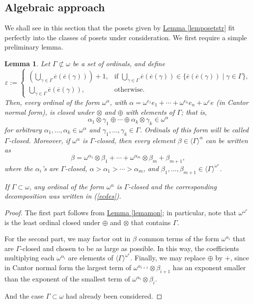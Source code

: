\documentclass[reqno]{amsart}
\newtheorem{lemma}[theorem]{Lemma}
\theoremstyle{definition}
\theoremstyle{definition}
\theoremstyle{plain} %
\begin{document}
\subsection{Algebraic approach} We shall see in this section that the posets given by \hyperref[lemposetstr]{Lemma \ref{lemposetstr}} fit perfectly into the classes of posets under consideration. We first require a simple preliminary lemma.
\begin{lemma}
    Let $\Gamma\not\subset\omega$ be a set of ordinals, and define\[\varepsilon :=\begin{cases}\left(\bigcup_{\gamma\in\Gamma}\overline{e}(\overline{e}(\gamma))\right) + 1, & \text{if } \bigcup_{\gamma\in\Gamma}\overline{e}(\overline{e}(\gamma)) \in \{\overline{e}(\overline{e}(\gamma)) \mid \gamma \in \Gamma\}, \\\bigcup_{\gamma\in\Gamma}\overline{e}(\overline{e}(\gamma)), & \text{otherwise}.\end{cases}\] Then, every ordinal of the form \(\omega^{\alpha}\), with $\alpha=\omega^{\epsilon_1} e_1 + \cdots + \omega^{\epsilon_n} e_n + \omega^{\varepsilon} e$ (in Cantor normal form), is closed under $\otimes$ and $\oplus$ with elements of $\Gamma$; that is,\[\alpha_1 \otimes \gamma_1 \oplus \cdots \oplus \alpha_k \otimes \gamma_k \in \omega^\alpha\]for arbitrary $\alpha_1, \dots, \alpha_k \in \omega^\alpha$ and $\gamma_1, \dots, \gamma_k \in \Gamma$. Ordinals of this form will be called \emph{$\Gamma$-closed}. Moreover, if $\omega^\alpha$ is $\Gamma$-closed, then every element $\beta\in\langle \Gamma \rangle^\alpha$ can be written as \[ \beta = \omega^{\alpha_1} \otimes \beta_1 + \cdots + \omega^{\alpha_m} \otimes \beta_m + \beta_{m+1}, \] where the $\alpha_i$'s are $\Gamma$-closed, $\alpha>\alpha_1 > \cdots > \alpha_m$, and $\beta_1, \dots, \beta_{m+1} \in \langle \Gamma \rangle^{\omega^\varepsilon}$.
    
    If $\Gamma\subset\omega$, any ordinal of the form $\omega^\alpha$ is $\Gamma$-closed and the corresponding decomposition was written in (\ref{ecdes}).
\end{lemma}
\begin{proof}
The first part follows from \hyperref[lemamon]{Lemma \ref{lemamon}}; in particular, note that $\omega^{\omega^\varepsilon}$ is the least ordinal closed under $\oplus$ and $\otimes$ that contains $\Gamma$.

For the second part, we may factor out in $\beta$ common terms of the form $\omega^{\alpha_i}$ that are $\Gamma$-closed and chosen to be as large as possible. In this way, the coefficients multiplying each $\omega^{\alpha_i}$ are elements of $\langle \Gamma \rangle^{\omega^\varepsilon}$. Finally, we may replace $\oplus$ by $+$, since in Cantor normal form the largest term of $\omega^{\alpha_{i+1}} \otimes \beta_{i+1}$ has an exponent smaller than the exponent of the smallest term of $\omega^{\alpha_i} \otimes \beta_i$.

And the case $\Gamma \subset \omega$ had already been considered.
\end{proof}
\end{document}
